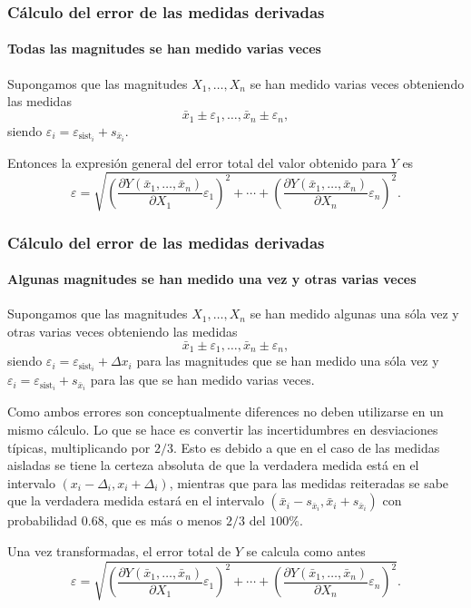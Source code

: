 \begin{frame}
	\frametitle{Cálculo del error de las medidas derivadas}
	\framesubtitle{Todas las magnitudes se han medido varias veces}
	Supongamos que las magnitudes $X_1,\ldots,X_n$ se han medido varias veces obteniendo las medidas
	\[
		\bar x_1\pm \varepsilon_1,\ldots, \bar x_n\pm\varepsilon_n,
	\] 
	siendo $\varepsilon_i=\varepsilon_{\textrm{sist}_i}+s_{\bar x_i}$.
	
	Entonces la expresión general del error total del valor obtenido para $Y$ es
	\[
		\varepsilon=\sqrt{\left(\frac{\partial Y(\bar x_1,\ldots,\bar x_n)}{\partial
			X_1}\varepsilon_1\right)^2+\cdots+\left(\frac{\partial Y(\bar x_1,\ldots,\bar x_n)}{\partial
			X_n}\varepsilon_n\right)^2}.
	\]
\end{frame}


\begin{frame}
	\frametitle{Cálculo del error de las medidas derivadas}
	\framesubtitle{Algunas magnitudes se han medido una vez y otras varias veces}
	Supongamos que las magnitudes $X_1,\ldots,X_n$ se han medido algunas una sóla vez y otras varias veces obteniendo las
	medidas
	\[
		\bar x_1\pm \varepsilon_1,\ldots, \bar x_n\pm\varepsilon_n,
	\] 
	siendo $\varepsilon_i=\varepsilon_{\textrm{sist}_i}+\Delta x_i$ para
	las magnitudes que se han medido una sóla vez y $\varepsilon_i=\varepsilon_{\textrm{sist}_i}+s_{\bar x_i}$ para las que
	se han medido varias veces.
	
	Como ambos errores son conceptualmente diferences no deben utilizarse en un mismo cálculo. Lo que se hace es convertir
	las incertidumbres en desviaciones típicas, multiplicando por $2/3$. Esto es debido a que en el caso de las
	medidas aisladas se tiene la certeza absoluta de que la verdadera medida está en el intervalo
	$(x_i-\Delta_i,x_i+\Delta_i)$, mientras que para las medidas reiteradas se sabe que la verdadera medida estará en el
	intervalo $(\bar x_i-s_{\bar x_i},\bar x_i+s_{\bar x_i})$ con probabilidad $0.68$, que es más o menos $2/3$ del
	$100\%$.
	
	Una vez transformadas, el error total de $Y$ se calcula como antes
	\[
		\varepsilon=\sqrt{\left(\frac{\partial Y(\bar x_1,\ldots,\bar x_n)}{\partial
			X_1}\varepsilon_1\right)^2+\cdots+\left(\frac{\partial Y(\bar x_1,\ldots,\bar x_n)}{\partial
			X_n}\varepsilon_n\right)^2}.
	\]
\end{frame}


